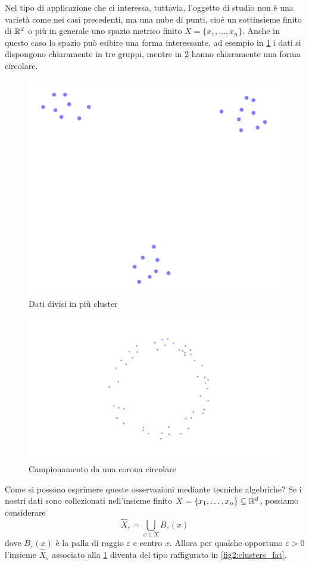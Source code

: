 Nel tipo di applicazione che ci interessa, tuttavia, l'oggetto di studio non è una varietà come nei casi precedenti, ma una nube di punti, cioé un sottinsieme finito di $\mathbb{R}^d$ o più in generale uno spazio metrico finito $X=\{x_1,\dots,x_n\}$. Anche in questo caso lo spazio può esibire una forma interessante, ad esempio in \cref{fig2:clusters} i dati si dispongono chiaramente in tre gruppi, mentre in \cref{fig2:circle} hanno chiaramente una forma circolare.

\begin{figure}[ht]
  \begin{center}
    \includegraphics[width=.4\linewidth]{gfx/three_clusters_small.pdf}
    \caption{Dati divisi in più cluster}
    \label{fig2:clusters}
  \end{center}
\end{figure}

\begin{figure}[ht]
  \begin{center}
    \includegraphics[width=\linewidth]{gfx/statistical_circle.pdf}
    \caption{Campionamento da una corona circolare}
    \label{fig2:circle}
  \end{center}
\end{figure}

Come si possono esprimere queste osservazioni mediante tecniche algebriche? Se i nostri dati sono collezionati nell'insieme finito $X=\{x_1,\dots,x_n\}\subseteq \mathbb{R}^d$, possiamo considerare
\begin{equation*}
  \widehat{X}_\varepsilon = \bigcup_{x\in X} B_\varepsilon(x)
\end{equation*}
dove $B_\varepsilon(x)$ è la palla di raggio $\varepsilon$ e centro $x$. Allora per qualche opportuno $\varepsilon >0$ l'insieme $\widehat{X}_\varepsilon$ associato alla \cref{fig2:clusters} diventa del tipo raffigurato in \cref{fig2:clusters_fat}.

